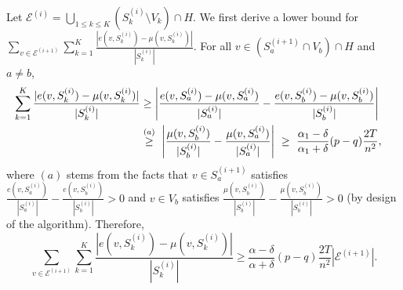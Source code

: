 Let $\mathcal{E}^{(i)} = \bigcup_{1\le  k \le K}(S^{(i)}_k
\setminus V_k)\cap H$. We first derive a lower bound for \\$\sum_{v\in \mathcal{E}^{(i+1)}} \sum_{k=1}^{K}\frac{|e(v,S^{(i)}_k)-\mu(v,S^{(i)}_k) |}{|
  S^{(i)}_k |}$. For all $v \in (S^{(i+1)}_a \cap V_b)\cap H$ and
$a\neq b$,
\begin{align*}
\sum_{k=1}^{K}\frac{|e(v,S^{(i)}_k)-\mu(v,S^{(i)}_k) |}{| S^{(i)}_k |}
&\ge \left|\frac{e(v,S^{(i)}_a)-\mu(v,S^{(i)}_a) }{|S^{(i)}_a |} - \frac{e(v,S^{(i)}_b)-\mu(v,S^{(i)}_b) }{| S^{(i)}_b |}\right| \cr
&\stackrel{(a)}{\ge}~\left|\frac{\mu(v,S^{(i)}_b) }{| S^{(i)}_b |} - \frac{\mu(v,S^{(i)}_a) }{| S^{(i)}_a |}\right|~\ge ~\frac{\alpha_1-\delta}{\alpha_1+\delta}(p-q)\frac{2T}{n^2},
\end{align*}
where $(a)$ stems from the facts that $v \in S^{(i+1)}_a$ satisfies $\frac{e(v,S^{(i)}_a) }{|
  S^{(i)}_a| } - \frac{e(v,S^{(i)}_b) }{| S^{(i)}_b | } >0$ and $v \in V_b$ satisfies
$\frac{\mu(v,S^{(i)}_b) }{| S^{(i)}_b |} - \frac{\mu(v,S^{(i)}_b) }{| S^{(i)}_b |} > 0$ (by design of the algorithm).
Therefore,
\begin{equation}
\sum_{v\in \mathcal{E}^{(i+1)}}\sum_{k=1}^{K}\frac{|e(v,S^{(i)}_k)-\mu(v,S^{(i)}_k) |}{|
  S^{(i)}_k |} \ge
\frac{\alpha-\delta}{\alpha+\delta}(p-q)\frac{2T}{n^2} |\mathcal{E}^{(i+1)}|. \label{eq:lbndimp}
\end{equation}

